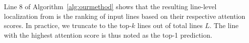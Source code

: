 Line 8 of Algorithm~\ref{alg:ourmethod} shows that the resulting line-level localization from \ourmethod{} is the ranking of input lines based on their respective attention scores. In practice, we truncate to the top-\( k \) lines out of total lines \( L \).
The line with the highest attention score is thus noted as the top-1 prediction.







